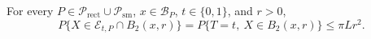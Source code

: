 For every \(P\in\mathcal{P}_{\mathrm{rect}}\cup\mathcal{P}_{\mathrm{sm}}\), \(x\in\mathcal{B}_P\), \(t\in\{0,1\}\), and \(r>0\),
\[
 P\{X\in\mathcal E_{t,P}\cap B_2(x,r)\}
 =P\{T=t,\ X\in B_2(x,r)\}
 \leq\pi Lr^2.
\]